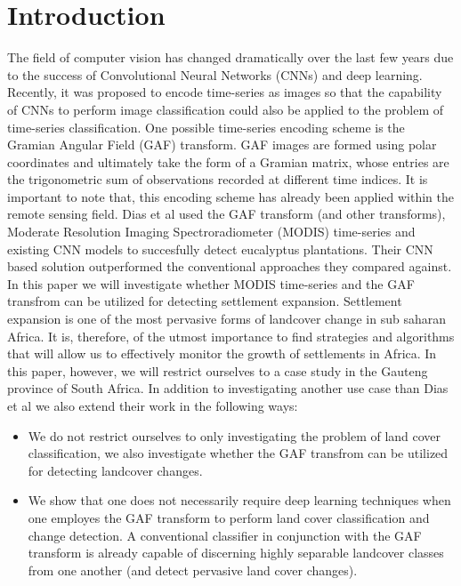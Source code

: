 \documentclass{article}
\begin{document}
\section{Introduction}
\label{sec:intro}
The field of computer vision has changed dramatically over the last few years due to the success of Convolutional Neural Networks (CNNs) and deep learning. Recently, it was proposed to encode time-series as images so that the capability of CNNs to perform image classification could also be applied to the problem of time-series classification. One possible time-series encoding scheme is the Gramian Angular Field (GAF) transform. GAF images are formed using polar coordinates and ultimately take the form of a Gramian matrix, whose entries are the trigonometric sum of observations recorded at different time indices. It is important to note that, this encoding scheme has already been applied within the remote sensing field. Dias et al used the GAF transform (and other transforms), Moderate Resolution Imaging Spectroradiometer (MODIS) time-series and existing CNN models to succesfully detect eucalyptus plantations. Their CNN based solution outperformed the conventional approaches they compared against. In this paper we will investigate whether MODIS time-series and the GAF transfrom can be utilized for detecting settlement expansion. Settlement expansion is one of the most pervasive forms of landcover change in sub saharan Africa. It is, therefore, of the utmost importance to find strategies and algorithms that will allow us to effectively monitor the growth of settlements in Africa. In this paper, however, we will restrict ourselves to a case study in the Gauteng province of South Africa. In addition to investigating another use case than Dias et al we also extend their work in the following ways:
\begin{itemize}
 \item We do not restrict ourselves to only investigating the problem of land cover classification, we also investigate whether the GAF transfrom can be utilized for detecting landcover changes.
 \item We show that one does not necessarily require deep learning techniques when one employes the GAF transform to perform land cover classification and change detection. A conventional classifier in conjunction with the GAF transform is already capable of discerning highly separable landcover classes from one another (and detect pervasive land cover changes).
\end{itemize}
  
\end{document}

